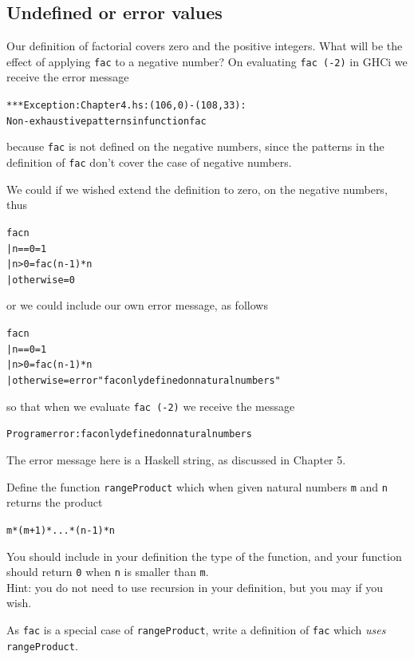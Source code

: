 \subsection*{Undefined or error values}

Our definition of factorial covers zero and the positive integers. What
will be the effect of applying \texttt{fac}
to a negative number? On evaluating \texttt{fac (-2)} in GHCi we receive
the error message
\begin{alltt}
*** Exception: Chapter4.hs:(106,0)-(108,33): 
        Non-exhaustive patterns in function fac
\end{alltt}
because \texttt{fac} is not defined on the negative numbers, since the patterns in the definition of \texttt{fac} don't cover the case of negative numbers.

We could if
we wished extend the definition to zero, on the negative numbers, thus
\begin{alltt}
fac n
  | n==0        = 1
  | n>0         = fac (n-1) * n
  | otherwise   = 0
\end{alltt}
or we could include our own error message, as follows
\begin{alltt}
fac n
  | n==0        = 1
  | n>0         = fac (n-1) * n
  | otherwise   = error "fac only defined on natural numbers"
\end{alltt}
so that when we evaluate \texttt{fac (-2)} we receive the message
\begin{alltt}
Program error: fac only defined on natural numbers
\end{alltt}
The error message here is a Haskell string, as discussed in Chapter
5.

\begin{exercises}

\item Define the function \texttt{rangeProduct}
which when given natural numbers \texttt{m} and
\texttt{n} returns the product 
\begin{alltt}
m*(m+1)*...*(n-1)*n
\end{alltt}
You should include in your definition the type of the function, and your function
should return \texttt{0} when \texttt{n} is smaller than \texttt{m}.\\
{Hint:} you do
not need to use recursion in your definition, but you may if you wish.

\item As \texttt{fac} is a special case of \texttt{rangeProduct}, 
write a definition of \texttt{fac}
which {\em uses\/} \texttt{rangeProduct}.
\end{exercises}

